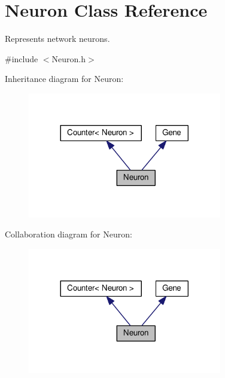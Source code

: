 \hypertarget{classNeuron}{}\section{Neuron Class Reference}
\label{classNeuron}


Represents network neurons.  




{\ttfamily \#include $<$Neuron.\+h$>$}



Inheritance diagram for Neuron\+:\nopagebreak
\begin{figure}[H]
\begin{center}
\leavevmode
\includegraphics[width=240pt]{classNeuron__inherit__graph}
\end{center}
\end{figure}


Collaboration diagram for Neuron\+:\nopagebreak
\begin{figure}[H]
\begin{center}
\leavevmode
\includegraphics[width=240pt]{classNeuron__coll__graph}
\end{center}
\end{figure}
